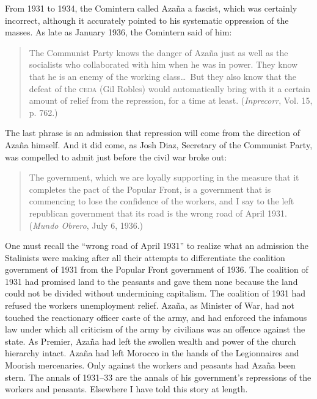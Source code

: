 From 1931 to 1934, the Comintern called Azaña a fascist, which was certainly incorrect, although it accurately pointed to his systematic oppression of the masses. As late as January 1936, the Comintern said of him:
\begin{quote}
  The Communist Party knows the danger of Azaña just as well as the socialists who collaborated with him when he was in power. They know that he is an enemy of the working class\ldots\ But they also know that the defeat of the \textsc{ceda} (Gil Robles) would automatically bring with it a certain amount of relief from the repression, for a time at least. (\emph{Inprecorr}, Vol. 15, p. 762.)
\end{quote}
The last phrase is an admission that repression will come from the direction of Azaña himself. And it did come, as Josh Diaz, Secretary of the Communist Party, was compelled to admit just before the civil war broke out:
\begin{quote}
  The government, which we are loyally supporting in the measure that it completes the pact of the Popular Front, is a government that is commencing to lose the confidence of the workers, and I say to the left republican government that its road is the wrong road of April 1931. (\emph{Mundo Obrero}, July 6, 1936.)
\end{quote}

One must recall the ``wrong road of April 1931'' to realize what an admission the Stalinists were making after all their attempts to differentiate the coalition government of 1931 from the Popular Front government of 1936. The coalition of 1931 had promised land to the peasants and gave them none because the land could not be divided without undermining capitalism. The coalition of 1931 had refused the workers unemployment relief. Azaña, as Minister of War, had not touched the reactionary officer caste of the army, and had enforced the infamous law under which all criticism of the army by civilians was an offence against the state. As Premier, Azaña had left the swollen wealth and power of the church hierarchy intact. Azaña had left Morocco in the hands of the Legionnaires and Moorish mercenaries. Only against the workers and peasants had Azaña been stern. The annals of 1931--33 are the annals of his government’s repressions of the workers and peasants. Elsewhere\label{en:CivilWarReference} I have told this story at length.


